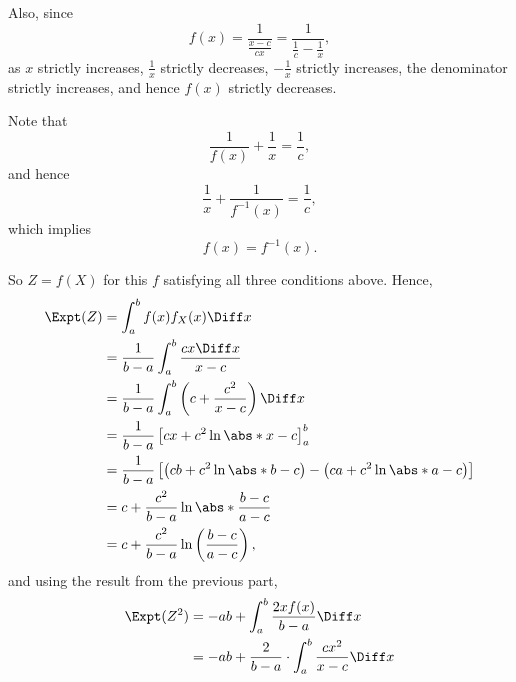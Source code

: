 \begin{enumerate}
          Also, since
          \[
              f(x) = \frac{1}{\frac{x - c}{cx}} = \frac{1}{\frac{1}{c} - \frac{1}{x}},
          \]
          as \(x\) strictly increases, \(\frac{1}{x}\) strictly decreases, \(- \frac{1}{x}\) strictly increases, the denominator strictly increases, and hence \(f(x)\) strictly decreases.

          Note that
          \[
              \frac{1}{f(x)} + \frac{1}{x} = \frac{1}{c},
          \]
          and hence
          \[
              \frac{1}{x} + \frac{1}{f^{-1}(x)} = \frac{1}{c},
          \]
          which implies
          \[
              f(x) = f^{-1}(x).
          \]

          So \(Z = f(X)\) for this \(f\) satisfying all three conditions above. Hence,
          \begin{align*}
              \Expt(Z) & = \int_{a}^{b} f(x) f_{X} (x) \Diff x                                                                          \\
                       & = \frac{1}{b - a} \int_{a}^{b} \frac{cx \Diff x}{x - c}                                                        \\
                       & = \frac{1}{b - a} \int_{a}^{b} \left(c + \frac{c^2}{x - c}\right) \Diff x                                      \\
                       & = \frac{1}{b - a} \left[cx + c^2 \ln \abs*{x - c}\right]_{a}^{b}                                               \\
                       & = \frac{1}{b - a} \left[\left(cb + c^2 \ln \abs*{b - c}\right) - \left(ca + c^2 \ln \abs*{a - c}\right)\right] \\
                       & = c + \frac{c^2}{b - a} \ln \abs*{\frac{b - c}{a - c}}                                                         \\
                       & = c + \frac{c^2}{b - a} \ln \left(\frac{b - c}{a - c}\right),
          \end{align*}
          and using the result from the previous part,
          \begin{align*}
              \Expt(Z^2) & = -ab + \int_{a}^{b} \frac{2x f(x)}{b - a} \Diff x                                                                                                          \\
                         & = -ab + \frac{2}{b - a} \cdot \int_{a}^{b} \frac{cx^2}{x - c} \Diff x                                                                                       \\

\end{align*}
\end{enumerate}
